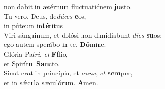 \oddverse non dabit in ætérnum fluctuatiónem \textbf{ju}sto.\\
\evenverse Tu vero, Deus, de\textit{dú}\textit{ces} \textbf{e}os,~\*\\
\evenverse in púteum in\textbf{té}ritus\\
\oddverse Viri sánguinum, et dolósi non dimidiábunt \textit{di}\textit{es} \textbf{su}os:~\*\\
\oddverse ego autem sperábo in te, \textbf{Dó}mine.\\
\evenverse Glória Pa\textit{tri}, \textit{et} \textbf{Fí}lio,~\*\\
\evenverse et Spirítui \textbf{San}cto.\\
\oddverse Sicut erat in princípio, et \textit{nunc}, \textit{et} \textbf{sem}per,~\*\\
\oddverse et in sǽcula sæculórum. \textbf{A}men.\\

